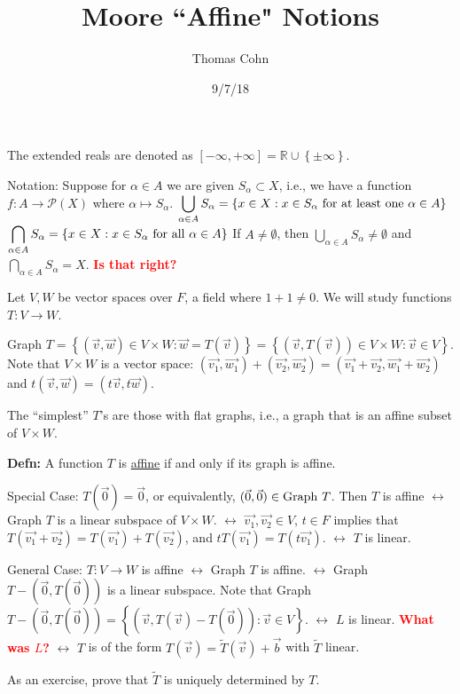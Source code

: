 \documentclass[10pt,letterpaper]{article}
\author{Thomas Cohn}
\title{Moore ``Affine" Notions}
\date{9/7/18} %
\newcommand{\n}{\hfill\break}
\newcommand{\defn}[1]{\par\noindent\settowidth{\hangindent}{\textbf{Defn: }}\textbf{Defn: }#1\n}
\newcommand{\ptxt}[1]{\textrm{\textnormal{#1}}}
\newcommand{\set}[1]{\left\{#1\right\}}
\newcommand{\ps}[1]{\mathcal{P}(#1)}
\newcommand{\reals}{\mathbb{R}}
\newcommand{\R}{\reals}
\newcommand{\flag}[1]{\textbf{\textcolor{red}{#1}}}
\begin{document}
\maketitle
\setlength\RaggedRightParindent{\parindent}
\RaggedRight

\par\noindent The extended reals are denoted as $[-\infty,+\infty]=\R\cup\set{\pm\infty}$.\n

\par\noindent Notation: Suppose for $\alpha\in{}A$ we are given $S_{\alpha}\subset{}X$, i.e., we have a function $f:A\to\ps{X}$ where $\alpha\mapsto{}S_{\alpha}$.\n
$\displaystyle\bigcup_{\alpha\in{}A}S_{\alpha}=\set{x\in{}X:x\in{}S_{\alpha}\ptxt{ for at least one }\alpha\in{}A}$\n
$\displaystyle\bigcap_{\alpha\in{}A}S_{\alpha}=\set{x\in{}X:x\in{}S_{\alpha}\ptxt{ for all }\alpha\in{}A}$\n
If $A\ne\emptyset$, then $\displaystyle\bigcup_{\alpha\in{}A}S_{\alpha}\ne\emptyset$ and $\displaystyle\bigcap_{\alpha\in{}A}S_{\alpha}=X$. \flag{Is that right?}\n\n

\par\noindent Let $V,W$ be vector spaces over $F$, a field where $1+1\ne{}0$. We will study functions $T:V\to{}W$.\n

\par\noindent Graph $T=\set{(\vec{v},\vec{w})\in{}V\times{}W:\vec{w}=T(\vec{v})}=\set{(\vec{v},T(\vec{v}))\in{}V\times{}W:\vec{v}\in{}V}$. Note that $V\times{}W$ is a vector space: $(\vec{v_{1}},\vec{w_{1}})+(\vec{v_{2}},\vec{w_{2}})=(\vec{v_{1}}+\vec{v_{2}},\vec{w_{1}}+\vec{w_{2}})$ and $t(\vec{v},\vec{w})=(t\vec{v},t\vec{w})$.\n

\par\noindent The ``simplest'' $T$'s are those with flat graphs, i.e., a graph that is an affine subset of $V\times{}W$.\n

\defn{A function $T$ is \underline{affine} if and only if its graph is affine.}

\par\noindent Special Case: $T(\vec{0})=\vec{0}$, or equivalently, $(\vec{0},\vec{0})\in\ptxt{Graph }T$.\n
Then $T$ is affine $\leftrightarrow$ Graph $T$ is a linear subspace of $V\times{}W$.\n
\phantom{Then $T$ is affine }$\leftrightarrow$ $\vec{v_{1}},\vec{v_{2}}\in{}V$, $t\in{}F$ implies that $T(\vec{v_{1}}+\vec{v_{2}})=T(\vec{v_{1}})+T(\vec{v_{2}})$, and $tT(\vec{v_{1}})=T(t\vec{v_{1}})$.\n
\phantom{Then $T$ is affine }$\leftrightarrow$ $T$ is linear.\n

\par\noindent General Case: $T:V\to{}W$ is affine $\leftrightarrow$ Graph $T$ is affine.\n
{}$\leftrightarrow$ Graph $T-(\vec{0},T(\vec{0}))$ is a linear subspace.\n
{}Note that Graph $T-(\vec{0},T(\vec{0}))=\set{(\vec{v},T(\vec{v})-T(\vec{0})):\vec{v}\in{}V}$.\n
{}$\leftrightarrow$ $L$ is linear. \flag{What was $L$?}\n
{}$\leftrightarrow$ $T$ is of the form $T(\vec{v})=\widetilde{T}(\vec{v})+\vec{b}$ with $\widetilde{T}$ linear.\n

\par\noindent As an exercise, prove that $\widetilde{T}$ is uniquely determined by $T$.
\end{document}
